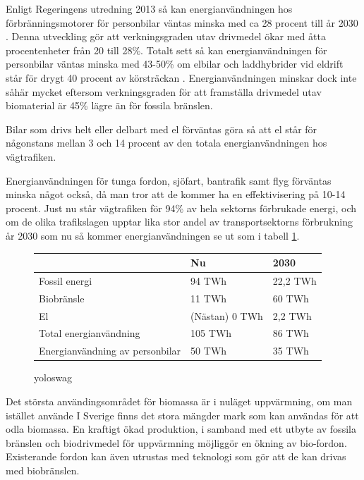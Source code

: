 \documentclass[a4paper,11pt,fleqn, titlepage]{article}
\begin{document}
Enligt Regeringens utredning 2013 så kan energianvändningen hos
förbränningsmotorer för personbilar väntas minska med ca 28 procent till år
2030 \cite{fossilfrihet}. Denna utveckling gör att verkningsgraden utav
drivmedel ökar med åtta procentenheter från 20 till 28\%.  Totalt sett så
kan energianvändningen för personbilar väntas minska med 43-50\% om elbilar
och laddhybrider vid eldrift står för drygt 40 procent av körsträckan
\cite{fossilfrihet}.  Energianvändningen minskar dock inte såhär mycket 
eftersom verkningsgraden för att framställa drivmedel utav biomaterial
är 45\% lägre än för fossila bränslen.

Bilar som drivs helt eller delbart med el förväntas göra så att el står för
någonstans mellan 3 och 14 procent av den totala energianvändningen hos
vägtrafiken.

Energianvändningen för tunga fordon, sjöfart, bantrafik samt flyg förväntas
minska något också, då man tror att de kommer ha en effektivisering på 10-14 procent.
Just nu står vägtrafiken för 94\% av hela sektorns förbrukade energi, och
om de olika trafikslagen upptar lika stor andel av transportsektorns
förbrukning år 2030 som nu så kommer energianvändningen se ut som i tabell
\ref{tab:scen1energi}.

\begin{figure}[h!]
	\begin{center}
	\begin{tabular}{ | l | l | l | }
	\hline
						& Nu		& 2030 \\ \hline
	Fossil energi				& 94 TWh	& 22,2 TWh \\ \hline
	Biobränsle				& 11 TWh	& 60 TWh \\ \hline %
	El					& (Nästan) 0 TWh &  2,2 TWh \\ \hline %
	Total energianvändning		& 105 TWh	& 86 TWh \\ \hline
	Energianvändning av personbilar	& 50 TWh	& 35 TWh \\ \hline
	\end{tabular}
	\caption{yoloswag}
	\label{tab:scen1energi}
\end{center}
\end{figure}



Det största användingsområdet för biomassa är i nuläget uppvärmning, om man istället använde
I Sverige finns det stora mängder mark som kan användas för att odla biomassa. En kraftigt ökad produktion, i samband med ett utbyte av fossila bränslen och biodrivmedel för uppvärmning möjliggör en ökning av bio-fordon. Existerande fordon kan även utrustas med teknologi som gör att de kan drivas med biobränslen.
\end{document}
